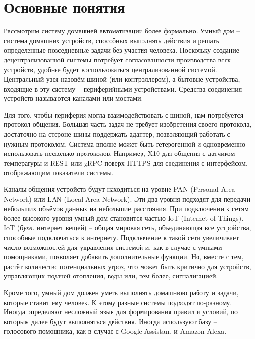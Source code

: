 \section{Основные понятия}

Рассмотрим систему домашней автоматизации более формально.
Умный дом -- система домашних устройств, способных выполнять действия и решать определенные повседневные задачи без участия человека.
Поскольку создание децентрализованной системы потребует согласованности производства всех устройств, удобнее будет воспользоваться централизованной системой.
Центральный узел назовём шиной (или контроллером), а бытовые устройства, входящие в эту систему -- периферийными устройствами.
Средства соединения устройств называются каналами или мостами.

Для того, чтобы периферия могла взаимодействовать с шиной, нам потребуется протокол общения.
Большая часть задач не требует изобретения своего протокола, достаточно на стороне шины поддержать адаптер, позволяющий работать с нужным протоколом.
Система вполне может быть гетерогенной и одновременно использовать несколько протоколов.
Например, X10 \cite{X10Spec} для общения с датчиком температуры и REST \cite{RESTSpec} или gRPC \cite{gRPCSpec} поверх HTTPS для соединения с интерфейсом, отображающим показатели системы.

Каналы общения устройств будут находиться на уровне PAN (Personal Area Network) или LAN (Local Area Network).
Эти два уровня подходят для передачи небольших объёмов данных на небольшие расстояния.
При подключении к сетям более высокого уровня умный дом становится частью IoT (Internet of Things).
IoT ({\itshape букв.} интернет вещей) -- общая мировая сеть, объединяющая все устройства, способные подключаться к интернету.
Подключение к такой сети увеличивает число возможностей для управления системой и, как в случае с умными помощниками, позволяет добавить дополнительные функции.
Но, вместе с тем, растёт количество потенциальных угроз, что может быть критично для устройств, управляющих подачей отопления, воды или, тем более, сигнализацией.

Кроме того, умный дом должен уметь выполнять домашнюю работу и задачи, которые ставит ему человек.
К этому разные системы подходят по-разному. Иногда определяют несложный язык для формирования правил и условий, по которым далее будут выполняться действия.
Иногда используют базу -- голосового помощника, как в случае с Google Assistant и Amazon Alexa.

